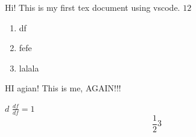 \documentclass{article}
\begin{document}
\maketitle
    Hi! This is my first tex document using vscode. 
    $12$
    \begin{enumerate}
        \item df
        \item fefe  
        \item lalala
    \end{enumerate}

    \newpage
    HI agian! This is me, AGAIN!!!

    $ d $ 
    $ \frac{df}{df} = 1  $ 
    $$ \frac{1}{2} 3 $$   
\end{document}
